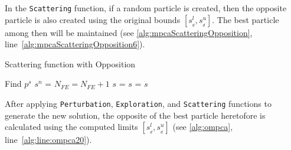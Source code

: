 In the \texttt{Scattering} function, if a random particle is created, then the opposite particle is also created using the original bounds $\left[ s^l_{_d}, s^u_{_d} \right]$. The best particle among then will be maintained (see \autoref{alg:mpcaScatteringOpposition}, line~\ref{alg:mpcaScatteringOpposition6}).

\begin{algorithm}[H]
\caption{Scattering function with Opposition}
\label{alg:mpcaScatteringOpposition}
\footnotesize
\begin{algorithmic}[1]
\State Find $p^s$
\State $s^n$ = 
\State $N_{FE} = N_{FE} + 1$
\State $s$ =  \label{alg:mpcaScatteringOpposition6}
\Else
\State $s$ = 
\EndIf
\State \Return $s$
\EndFunction
\end{algorithmic}
\end{algorithm}

After applying \texttt{Perturbation}, \texttt{Exploration}, and \texttt{Scattering} functions to generate the new solution, the opposite of the best particle heretofore is calculated using the computed limits $\left[ s^l_{_d}, s^u_{_d} \right]$ (see \autoref{alg:ompca}, line~\ref{alg:line:ompca20}).